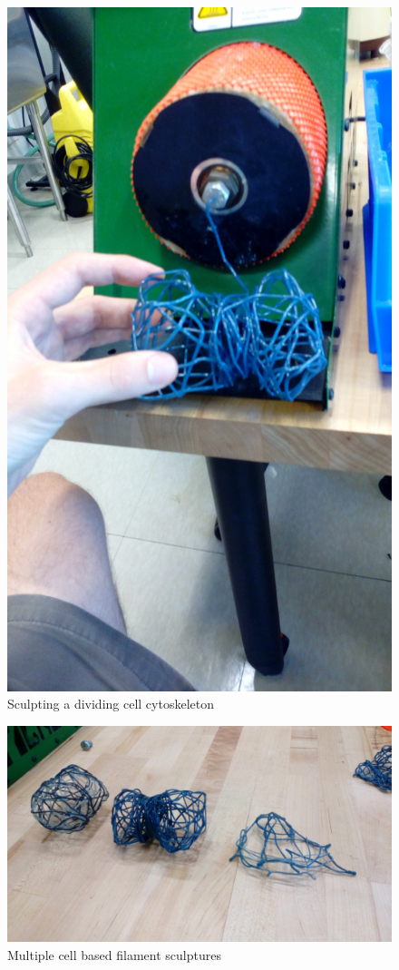\begin{figure}[h!]
\centering
\includegraphics[width=0.5\hsize]{art/IMG_20160801_115125.jpg}
\caption{\label{fig:art_1} Sculpting a dividing cell cytoskeleton }
\end{figure}



\begin{figure}[h!]
\centering
\includegraphics[width=\hsize]{art/IMG_20160801_121232.jpg}
\caption{\label{fig:art_3} Multiple cell based filament sculptures }
\end{figure}

